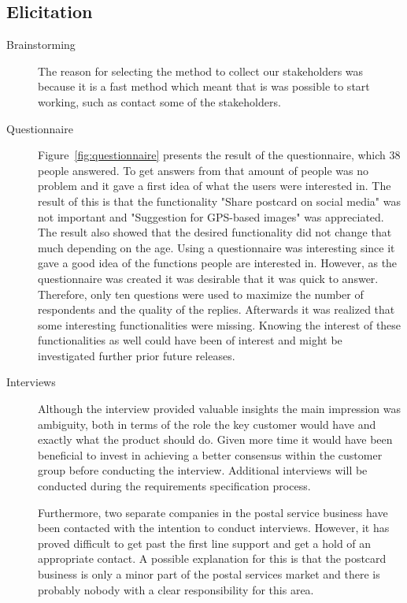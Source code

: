 \documentclass[10pt,a4paper]{article}
\begin{document}
\subsection{Elicitation}
\begin{description}
\item[Brainstorming]The reason for selecting the method to collect our stakeholders was because it is a fast method which meant that is was possible to start working, such as contact some of the stakeholders. 

\item[Questionnaire] Figure~\ref{fig:questionnaire} presents the result of the questionnaire, which 38 people answered. To get answers from that amount of people was no problem and it gave a first idea of what the users were interested in. The result of this is that the functionality "Share postcard on social media" was not important and "Suggestion for GPS-based images" was appreciated. The result also showed that the desired functionality did not change that much depending on the age. Using a questionnaire was interesting since it gave a good idea of the functions people are interested in. However, as the questionnaire  was created it was desirable that it was quick to answer. Therefore, only ten questions were used to maximize the number of respondents and the quality of the replies. Afterwards it was realized that some interesting functionalities were missing. Knowing the interest of these functionalities as well could have been of interest and might be investigated further prior future releases.

\item[Interviews] Although the interview provided valuable insights the main impression was ambiguity, both in terms of the role the key customer would have and exactly what the product should do. Given more time it would have been beneficial to invest in achieving a better consensus within the customer group before conducting the interview. Additional interviews will be conducted during the requirements specification process.

Furthermore, two separate companies in the postal service business have been contacted with the intention to conduct interviews. However, it has proved difficult to get past the first line support and get a hold of an appropriate contact. A possible explanation for this is that the postcard business is only a minor part of the postal services market and there is probably nobody with a clear responsibility for this area.  


\end{description}
\end{document}
